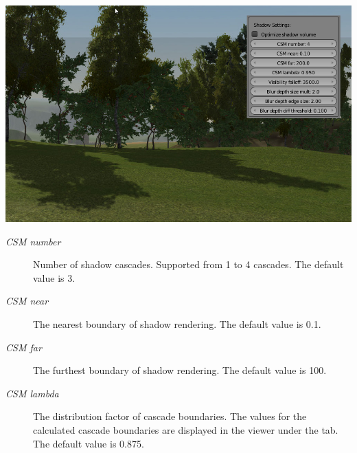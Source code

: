\documentclass[a4paper,12pt,oneside]{sphinxmanual}
\begin{document}
{\hfill\includegraphics[width=1.000\linewidth]{shadow_cascades.jpg}\hfill}

\begin{DUlineblock}{0em}
\item[] 
\end{DUlineblock}
\begin{description}
\item[{\emph{CSM number}}] \leavevmode
Number of shadow cascades. Supported from 1 to 4 cascades. The default value is 3.

\item[{\emph{CSM near}}] \leavevmode
The nearest boundary of shadow rendering. The default value is 0.1.

\item[{\emph{CSM far}}] \leavevmode
The furthest boundary of shadow rendering. The default value is 100.

\item[{\emph{CSM lambda}}] \leavevmode
The distribution factor of cascade boundaries. The values for the calculated cascade boundaries are displayed in the viewer under the  tab. The default value is 0.875.

\end{description}
\end{document}
